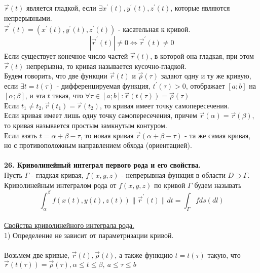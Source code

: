 \documentclass[12pt]{article}
\begin{document}
$\overrightarrow{r}(t)$ является гладкой, если $\exists x^{'}(t), y^{'}(t), z^{'}(t)$, которые являются непрерывными.\\
$\overrightarrow{r}^{'}(t) = (x^{'}(t),y^{'}(t),z^{'}(t))$ - касательная к кривой.\\
$$|\overrightarrow{r}^{'}(t)| \neq 0 \iff \overrightarrow{r}^{'}(t) \neq 0$$
Если существует конечное число частей $\overrightarrow{r}(t)$, в которой она гладкая, при этом $\overrightarrow{r}(t)$ непрерывна, то кривая называется кусочно-гладкой.\\
Будем говорить, что две функции $\overrightarrow{r}(t)$ и $\overrightarrow{\rho}(\tau)$ задают одну и ту же кривую, если $\exists t = t(\tau)$ - дифференцируемая функция, $t^{'}(\tau)>0$, отображает $[a;b]$ на $[\alpha; \beta]$, и эта $t$ такая, что $\forall \tau \in [a;b] : \overrightarrow{r}(t(\tau))=\overrightarrow{\rho}(\tau)$\\
Если $t_1 \neq t_2, \overrightarrow{r}(t_1)=\overrightarrow{r}(t_2)$, то кривая имеет точку самопересечения.\\
Если кривая имеет лишь одну точку самопересечения, причем $\overrightarrow{r}(\alpha)=\overrightarrow{r}(\beta)$, то кривая называется простым замкнутым контуром.\\
Если взять $t = \alpha + \beta - \tau$, то новая кривая $\overrightarrow{r}(\alpha + \beta - \tau)$ - та же самая кривая, но с противоположным направлением обхода (ориентацией).\\
\\
\label{question26}\textbf{26. Криволинейный интеграл первого рода и его свойства.}\\
Пусть $\Gamma$ - гладкая кривая, $f(x,y,z)$ - непрерывная функция в области $D \supset \Gamma$.\\
Криволинейным интегралом  рода от $f(x,y,z)$ по кривой $\Gamma$ будем называть\\
$$\int_\alpha^\beta f(x(t), y(t), z(t)) \| \overrightarrow{r}^{'}(t)\|dt = \int_\Gamma f ds (dl)$$
\\
\uline{Свойства криволинейного интеграла  рода.}\\
1) Определение не зависит от параметризации кривой.\\
\\
Возьмем две кривые, $\overrightarrow{r}(t), \overrightarrow{\rho}(t)$, а также функцию $t=t(\tau)$ такую, что $\overrightarrow{r}(t(\tau))=\overrightarrow{\rho}(\tau), \alpha \leq t \leq \beta, \ a \leq \tau \leq b$\\
\end{document}
